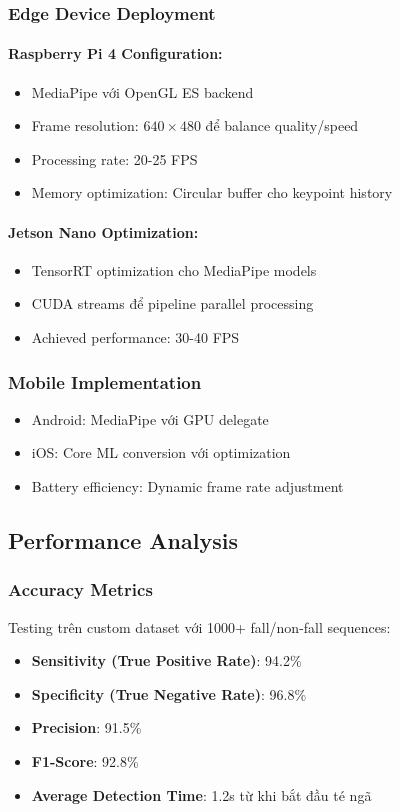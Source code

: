 \subsubsection{Edge Device Deployment}
\paragraph{Raspberry Pi 4 Configuration:}
\begin{itemize}
    \item MediaPipe với OpenGL ES backend
    \item Frame resolution: $640 \times 480$ để balance quality/speed
    \item Processing rate: 20-25 FPS
    \item Memory optimization: Circular buffer cho keypoint history
\end{itemize}

\paragraph{Jetson Nano Optimization:}
\begin{itemize}
    \item TensorRT optimization cho MediaPipe models
    \item CUDA streams để pipeline parallel processing
    \item Achieved performance: 30-40 FPS
\end{itemize}

\subsubsection{Mobile Implementation}
\begin{itemize}
    \item Android: MediaPipe với GPU delegate
    \item iOS: Core ML conversion với optimization
    \item Battery efficiency: Dynamic frame rate adjustment
\end{itemize}

\subsection{Performance Analysis}

\subsubsection{Accuracy Metrics}
Testing trên custom dataset với 1000+ fall/non-fall sequences:
\begin{itemize}
    \item \textbf{Sensitivity (True Positive Rate)}: 94.2\%
    \item \textbf{Specificity (True Negative Rate)}: 96.8\%
    \item \textbf{Precision}: 91.5\%
    \item \textbf{F1-Score}: 92.8\%
    \item \textbf{Average Detection Time}: 1.2s từ khi bắt đầu té ngã
\end{itemize}

